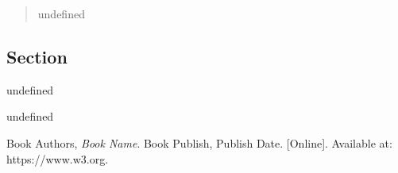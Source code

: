 \documentclass[letterpaper,10pt,ptm,onecolumn]{IEEEtran}
\begin{document}
\begin{titlepage}
\centering{}\fontsize{16pt}{16pt}\selectfont {undefined}
\end{titlepage}

\begin{abstract}
\noindent undefined\\
\end{abstract}

\begin{multicols}{2}
\section*{\selectfont Section}
\noindent undefined
\\\par
\noindent undefined

\begin{thebibliography}{9}
 Book Authors, \textit{Book Name}. Book Publish, Publish Date. [Online]. Available at: https://www.w3.org.
\end{thebibliography}
\end{multicols}
\end{document}
